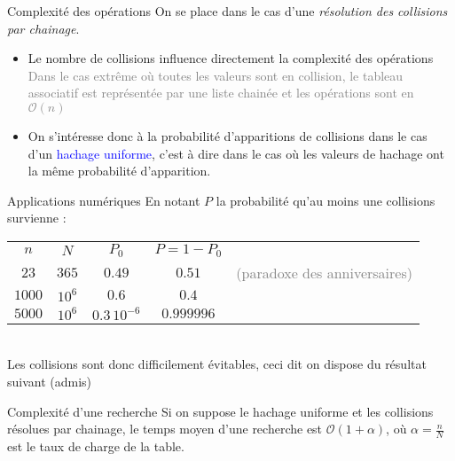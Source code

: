 \documentclass[10pt]{beamer}
\begin{document}
\begin{frame}{\Ctitle}{\stitle}
	\begin{block}{Complexité des opérations}
		\textcolor{BrickRed}{\small \danger} On se place dans le cas d'une \textit{résolution des collisions par chainage}.
		\begin{itemize}
			\item<1-> Le nombre de collisions influence directement la complexité des opérations \\
			\onslide<2->\textcolor{gray}{\small Dans le cas extrême où toutes les valeurs sont en collision, le tableau associatif est représentée par une liste chainée et les opérations sont en $\mathcal{O}(n)$}
			\item<3-> On s'intéresse donc à la probabilité d'apparitions de collisions dans le cas d'un \textcolor{blue}{hachage uniforme}, c'est à dire dans le cas où les valeurs de hachage ont la même probabilité d'apparition.
		\end{itemize}
	\end{block}
\end{frame}

\begin{frame}{\Ctitle}{\stitle}
	\begin{exampleblock}{Applications numériques}
		\renewcommand{\arraystretch}{1.4}
		En notant $P$ la probabilité qu'au moins une collisions survienne :
		\begin{tabular}{|c|c|c|c|c}
			\cline{1-4}
			$n$ & $N$ & $P_0$ & $P = 1 - P_0$ & \\
			\cline{1-4}
			$23$ & $365$ & $0.49$ & $0.51$ & \textcolor{gray}{\small (paradoxe des anniversaires)} \\
			\cline{1-4}
			$1000$ & $10^6$ & $0.6$  & $0.4$ & \\
			\cline{1-4}
			$5000$ & $10^6$ & $0.3\,10^{-6}$ &  $0.999996$ &\\
			\cline{1-4}
		\end{tabular} \\
	Les collisions sont donc difficilement évitables, ceci dit on dispose du résultat suivant (admis)
	\end{exampleblock}
	\begin{alertblock}{Complexité d'une recherche}
		Si on suppose le hachage uniforme et les collisions résolues par chainage, le temps moyen d'une recherche est $\mathcal{O}(1+\alpha)$, où $\alpha = \frac{n}{N}$ est le taux de charge de la table.
	\end{alertblock}
\end{frame}
\end{document}
